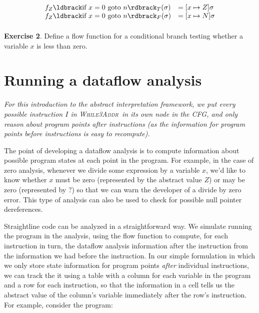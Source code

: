 \documentclass[11pt]{article}
\newcommand{\exercise}[1]
  {\bigskip \noindent
   {\bf Exercise #1}.}
\newcommand{\printanswer}[1]
  {}   %
\newcommand{\answer}[2]
  {\bigskip \printanswer{\noindent
   {\bf Sample Answer #1}. #2 \bigskip}}
\newcommand{\parg}[1] %
  {\ldbrack #1 \rdbrack}
\def\WhileThAddr{\textsc{While3Addr}}
\begin{document}
\[
\begin{array}{lll}

f_Z\parg{\mbox{if}~x=0~\mbox{goto}~n}_T(\sigma) & = [x \mapsto Z]\sigma\\
f_Z\parg{\mbox{if}~x=0~\mbox{goto}~n}_F(\sigma) & = [x \mapsto N]\sigma\\[1ex]

\end{array}
\]

\exercise{2}  Define a flow function for a conditional branch testing whether a variable $x$ is less than zero.

\answer{2}{We get no additional information in the false case.  However, we can define the true case as follows:\\ \[ f_Z\parg{\mbox{if}~x<0~\mbox{goto}~n}_T(\sigma) = [x \mapsto N]\sigma \]}


\section{Running a dataflow analysis}

\emph{For this introduction to the abstract interpretation framework, we put
  every possible instruction $I$ in \WhileThAddr\ in its own node in the CFG,
  and only reason about program points after instructions (as the information
  for program points before instructions is easy to recompute).}
 
The point of developing a dataflow analysis is to compute information about
possible program states at each point in the program.  For example, in the case
of zero analysis, whenever we divide some expression by a variable $x$, we'd
like to know whether $x$ must be zero (represented by the abstract value $Z$) or
may be zero (represented by $?$) so that we can warn the developer of a divide
by zero error.  This type of analysis can also be used to check for possible
null pointer dereferences.

Straightline code can be analyzed in a straightforward way.  We simulate running
the program in the analysis, using the flow function to compute, for each
instruction in turn, the dataflow analysis information after the instruction
from the information we had before the instruction.  In our simple formulation
in which we only store state information for program points \emph{after}
individual instructions, we can track the it using a table with a column for
each variable in the program and a row for each instruction, so that the
information in a cell tells us the abstract value of the column's variable
immediately after the row's instruction.  For example, consider the program:
\end{document}
